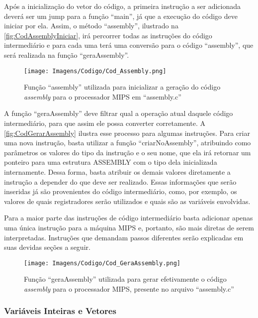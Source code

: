 \documentclass[
	12pt,				%
	oneside,
	a4paper,			%
	english,			%
	french,				%
	spanish,			%
	brazil,				%
	]{abntex2}
\begin{document}
Após a inicialização do vetor do código, a primeira instrução a ser adicionada deverá ser um jump para a função ``main'', já que a execução do código deve iniciar por ela. Assim, o método ``assembly'', ilustrado na \autoref{fig:CodAssemblyIniciar}, irá percorrer todas as instruções do código intermediário e para cada uma terá uma conversão para o código ``assembly'', que será realizada na função ``geraAssembly''.

\begin{figure}[tbhp]
\centering 
\caption{Função ``assembly'' utilizada para inicializar a geração do código \emph{assembly} para o processador MIPS em \nohyphens{``assembly.c''}} 
\label{fig:CodAssemblyIniciar}
\graphicspath{ {./Imagens/} } 
\texttt{[image: Imagens/Codigo/Cod\_Assembly.png]}
\end{figure}

A função ``geraAssembly'' deve filtrar qual a operação atual daquele código intermediário, para que assim ele possa converter corretamente. A \autoref{fig:CodGerarAssembly} ilustra esse processo para algumas instruções. Para criar uma nova instrução, basta utilizar a função ``criarNoAssembly'', atribuindo como parâmetros os valores do tipo da instrução e o seu nome, que ela irá retornar um ponteiro para uma estrutura ASSEMBLY com o tipo dela inicializada internamente. Dessa forma, basta atribuir os demais valores diretamente a instrução a depender do que deve ser realizado. Essas informações que serão inseridas já são provenientes do código intermediário, como, por exemplo, os valores de quais registradores serão utilizados e quais são as variáveis envolvidas. 

Para a maior parte das instruções de código intermediário basta adicionar apenas uma única instrução para a máquina MIPS e, portanto, são mais diretas de serem interpretadas. Instruções que demandam passos diferentes serão explicadas em suas devidas seções a seguir. 

\begin{figure}[H]
\centering 
\caption{Função ``geraAssembly'' utilizada para gerar efetivamente o código \emph{assembly} para o processador MIPS, presente no arquivo \nohyphens{``assembly.c''}} 
\label{fig:CodGerarAssembly}
\graphicspath{ {./Imagens/} } 
\texttt{[image: Imagens/Codigo/Cod\_GeraAssembly.png]}
\end{figure}

\subsubsection{Variáveis Inteiras e Vetores}
\end{document}
